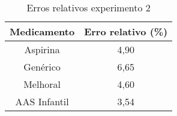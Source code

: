  \begin{table}[H]\label{err_exp2}
     \centering
\begin{tabular}{c c}
    \toprule
    \textbf{Medicamento} & \textbf{Erro relativo (\%)} \\
    \midrule
    Aspirina\R & 4,90 \\
    Genérico & 6,65 \\
    Melhoral\R & 4,60 \\
    AAS Infantil & 3,54 \\
    \bottomrule
\end{tabular}
\caption{Erros relativos experimento 2}
 \end{table}
